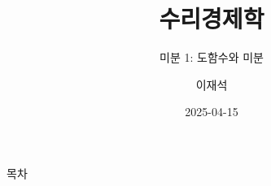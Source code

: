 \documentclass[aspectratio=169]{beamer}
\title{수리경제학}
\subtitle{미분 1: 도함수와 미분}
\author{이재석}
\date{2025-04-15}
\begin{document}
\begin{frame}
  \titlepage
\end{frame}

\begin{frame}{목차}
  \tableofcontents
\end{frame}


\end{document}
